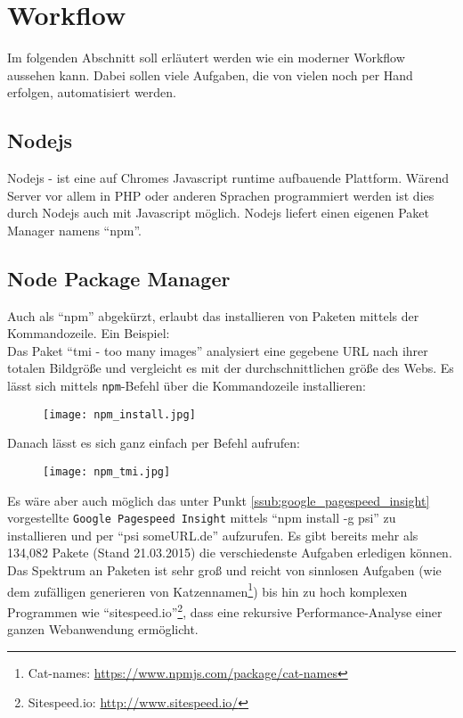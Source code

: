 \section{Workflow} %
\label{sec:workflow}
	Im folgenden Abschnitt soll erläutert werden wie ein moderner Workflow aussehen kann. Dabei sollen viele Aufgaben, die von vielen noch per Hand erfolgen, automatisiert werden.\\

	\subsection{Nodejs} %
	\label{sub:nodejs}
		Nodejs - ist eine auf Chromes Javascript runtime aufbauende Plattform. Wärend Server vor allem in PHP oder anderen Sprachen programmiert werden ist dies durch Nodejs auch mit Javascript möglich. Nodejs liefert einen eigenen Paket Manager namens "`npm"'.

	\subsection{Node Package Manager} %
	\label{sub:node_package_manager}
		Auch als "`npm"' abgekürzt, erlaubt das installieren von Paketen mittels der Kommandozeile. Ein Beispiel:\\
		Das Paket "`tmi - too many images"' analysiert eine gegebene URL nach ihrer totalen Bildgröße und vergleicht es mit der durchschnittlichen größe des Webs. Es lässt sich mittels \texttt{npm}-Befehl über die Kommandozeile installieren:
		\begin{figure}[htbp]
			\begin{center}
				\texttt{[image: npm\_install.jpg]}
				\label{fig:npm_install}
			\end{center}
		\end{figure}
		Danach lässt es sich ganz einfach per Befehl aufrufen:
		\begin{figure}[htbp]
			\begin{center}
				\texttt{[image: npm\_tmi.jpg]}
				\label{fig:npm_tmi}
			\end{center}
		\end{figure}

		Es wäre aber auch möglich das unter Punkt \ref{ssub:google_pagespeed_insight} vorgestellte \texttt{Google Pagespeed Insight} mittels "`npm install -g psi"' zu installieren und per "`psi someURL.de"' aufzurufen. Es gibt bereits mehr als 134,082 Pakete (Stand 21.03.2015) die verschiedenste Aufgaben erledigen können. Das Spektrum an Paketen ist sehr groß und reicht von sinnlosen Aufgaben (wie dem zufälligen generieren von Katzennamen\footnote{Cat-names: \url{https://www.npmjs.com/package/cat-names}}) bis hin zu hoch komplexen Programmen wie "`sitespeed.io"'\footnote{Sitespeed.io: \url{http://www.sitespeed.io/}}, dass eine rekursive Performance-Analyse einer ganzen Webanwendung ermöglicht.\\

